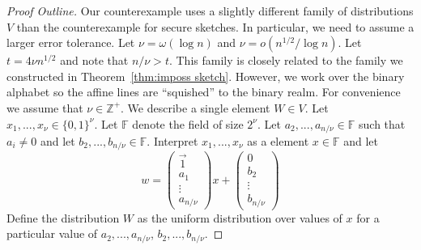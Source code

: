 \documentclass[11pt]{article}
\newcommand{\thref}[1]{\mbox{Theorem~\ref{#1}}}
\newcommand{\zo}{\ensuremath{\{0, 1\}}}
\begin{document}
\begin{proof}[Proof Outline]
Our counterexample uses a slightly different family of distributions $V$ than the counterexample for secure sketches.  In particular, we need to assume a larger error tolerance.  Let $\nu = \omega(\log n)$ and $\nu = o(n^{1/2}/\log n)$.  Let $t=4\nu n^{1/2}$ and note that $n/\nu >t$.  This family is closely related to the family we constructed in \thref{thm:imposs sketch}.  However, we work over the binary alphabet so the affine lines are ``squished'' to the binary realm.  For convenience we assume that $\nu\in\mathbb{Z}^+$.  We describe a single element $W\in V$. Let $x_1,..., x_\nu \in \zo^\nu$.  Let $\mathbb{F}$ denote the field of size $2^{\nu}$.  Let $a_2,..., a_{n/\nu}\in\mathbb{F}$ such that $a_i\neq 0$ and let $b_2,..., b_{n/\nu}\in\mathbb{F}$.  
Interpret $x_1,..., x_{\nu}$ as a element $x\in \mathbb{F}$ and let 
\[w =  \begin{pmatrix} \vec{1} \\a_1  \\ \vdots \\ a_{n/\nu} \end{pmatrix} x + \begin{pmatrix} 0  \\ 
b_2\\ \vdots \\ b_{n/\nu} \end{pmatrix} 
\]
Define the distribution $W$ as the uniform distribution over values of $x$ for a particular value of $a_2,..., a_{n/\nu}$, $b_2,..., b_{n/\nu}$.  


\end{proof}
\end{document}
